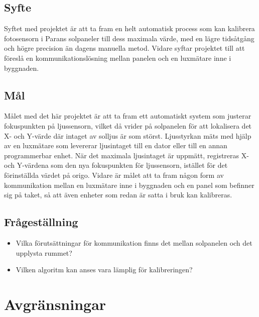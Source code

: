     \subsection{Syfte} %
    \label{sub:syfte}
          Syftet med projektet är att ta fram en helt automatisk process som kan kalibrera fotosensorn i Parans solpaneler till dess maximala värde, med en lägre tidsåtgång och högre precision än dagens manuella metod. 
          Vidare syftar projektet till att föreslå en kommunikationslösning mellan panelen och en lux\-mätare inne i byggnaden.

    \subsection{Mål} %
    \label{sun:mal}
        Målet med det här projektet är att ta fram ett automatiskt system som justerar fokuspunkten på ljussensorn, vilket då vrider på solpanelen för att lokalisera det X- och Y-värde där intaget av solljus är som störst. 
        Ljusstyrkan mäts med hjälp av en luxmätare som levererar ljusintaget till en dator eller till en annan programmerbar enhet. 
        När det maximala ljusintaget är uppmätt, registreras X- och Y-värdena som den nya fokuspunkten för ljussensorn, istället för det förinställda värdet på origo. 
        Vidare är målet att ta fram någon form av kommunikation mellan en luxmätare inne i byggnaden och en panel som befinner sig på taket, så att även enheter som redan är satta i bruk kan kalibreras. 


    \subsection{Frågeställning} %
    \label{sub:fragestallning}
        \begin{itemize}
            \item Vilka förutsättningar för kommunikation finns det mellan solpanelen och det upplysta rummet? \\
            \item Vilken algoritm kan anses vara lämplig för kalibreringen?
        \end{itemize}

    \section{Avgränsningar} %
    \label{sec:avgr_nsningar}
